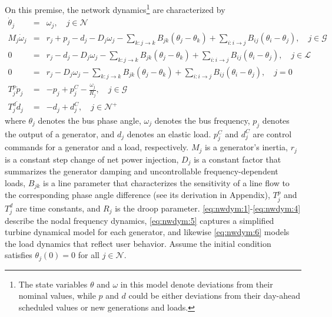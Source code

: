 \documentclass[journal,12pt,onecolumn,draftclsnofoot]{IEEEtran}
\begin{document}
On this premise, the network dynamics\footnote{The state variables $\theta$ and $\omega$ in this model denote deviations from their nominal values, while $p$ and $d$ could be either deviations from their day-ahead scheduled values or new generations and loads.} are characterized by
\begin{subequations}
	\begin{eqnarray}
	   \label{eq:nwdym:1}
	    \dot \theta_j  	& = &  \omega_j, \quad j\in\mathcal{N} \\
	   \label{eq:nwdym:2}
      	M_j \dot \omega_j & = & r_j+p_j - d_j -D_j \omega_j - \sum_{k:j\rightarrow k} B_{jk}(\theta_j-\theta_k) +\sum_{i:i\rightarrow j} B_{ij}(\theta_i-\theta_j)  , \quad j\in\mathcal{G} \\
        \label{eq:nwdym:3}
      	0 & = & r_j - d_j  -D_j \omega_j - \sum_{k:j\rightarrow k} B_{jk}(\theta_j-\theta_k) +\sum_{i:i\rightarrow j} B_{ij}(\theta_i-\theta_j) , \quad j\in\mathcal{L}  \\
        \label{eq:nwdym:4}
      	0 & = & r_j   -D_j \omega_j - \sum_{k:j\rightarrow k} B_{jk}(\theta_j-\theta_k) +\sum_{i:i\rightarrow j} B_{ij}(\theta_i-\theta_j) , \quad j=0  \\
        \label{eq:nwdym:5}
      	T_j^p \dot p_j & =  & -p_j + p_j^C-\frac{\omega_j}{R_j} , \quad j \in\mathcal{G} \\
        \label{eq:nwdym:6}
      	T_j^d \dot d_j & =  & -d_j + d_j^C , \quad j \in\mathcal{N}^+ 
 	\end{eqnarray}\label{eq:nwdym}%
\end{subequations}
where $\theta_j$ denotes the bus phase angle, $\omega_j$ denotes the bus frequency, $p_j$ denotes the output of a generator, and $d_j$ denotes an elastic load. $p_j^C$ and $d_j^C$ are control commands for a generator and a load, respectively. $M_j$ is a generator's inertia, $r_j$ is a constant step change of net power injection, $D_j$ is a constant factor that summarizes the generator damping and uncontrollable frequency-dependent loads, $B_{jk}$ is a line parameter that characterizes the sensitivity of a line flow to the corresponding phase angle difference (see its derivation in Appendix), $T_j^p$ and $T_j^d$ are time constants, and $R_j$ is the droop parameter. \eqref{eq:nwdym:1}-\eqref{eq:nwdym:4} describe the nodal frequency dynamics, \eqref{eq:nwdym:5} captures a simplified turbine dynamical model for each generator, and likewise \eqref{eq:nwdym:6} models the load dynamics that reflect user behavior. Assume the initial condition satisfies $\theta_j(0)=0$ for all $j\in\mathcal{N}$. %
\end{document}
